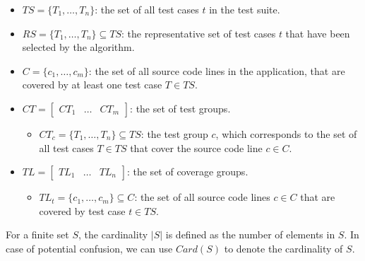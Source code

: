 \begin{definition}
\label{def:alg-naming}
\mbox{}
\begin{itemize}
	\item $TS = \{T_1, \dots, T_n\}$: the set of all test cases $t$ in the test suite.
	\item $RS = \{T_1, \dots, T_n\} \subseteq TS$: the representative set of test cases $t$ that have been selected by the algorithm.
	\item $C = \{c_1, \dots, c_m\}$: the set of all source code lines in the application, that are covered by at least one test case $T \in TS$.
	\item $CT = \begin{bmatrix}
		CT_1 & \dots & CT_m
	\end{bmatrix}$: the set of test groups.
		\begin{itemize}
			\item $CT_c = \{T_1, \dots, T_n\} \subseteq TS$: the test group $c$, which corresponds to the set of all test cases $T \in TS$ that cover the source code line $c \in C$.
		\end{itemize}
	\item $TL = \begin{bmatrix}
		TL_1 & \dots & TL_n
	\end{bmatrix}$: the set of coverage groups.
		\begin{itemize}
			\item $TL_t = \{c_1, \dots, c_m\} \subseteq C$: the set of all source code lines $c \in C$ that are covered by test case $t \in TS$.
		\end{itemize}
\end{itemize}
\end{definition}

\begin{definition}[Cardinality]
\label{def:cardinality}
For a finite set $S$, the cardinality $|S|$ is defined as the number of elements in $S$. In case of potential confusion, we can use $Card(S)$ to denote the cardinality of $S$.
\end{definition}


\clearpage

\clearpage
